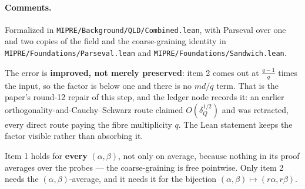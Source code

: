 \paragraph{Comments.} Formalized in \texttt{MIPRE/Background/QLD/Combined.lean}, with Parseval
over one and two copies of the field and the coarse-graining identity in
\texttt{MIPRE/Foundations/Parseval.lean} and \texttt{MIPRE/Foundations/Sandwich.lean}.

The error is \textbf{improved, not merely preserved}: item 2 comes out at $\tfrac{q-1}{q}$ times
the input, so the factor is below one and there is no $md/q$ term. That is the paper's
round-12 repair of this step, and the ledger node records it: an earlier
orthogonality-and-Cauchy--Schwarz route claimed $O(\delta_Q^{1/2})$ and was retracted, every
direct route paying the fibre multiplicity $q$. The Lean statement keeps the factor visible
rather than absorbing it.

Item 1 holds for \textbf{every} $(\alpha, \beta)$, not only on average, because nothing in its
proof averages over the probes --- the coarse-graining is free pointwise. Only item 2 needs the
$(\alpha,\beta)$-average, and it needs it for the bijection $(\alpha, \beta) \mapsto (r\alpha,
r\beta)$.

\effortMedium

